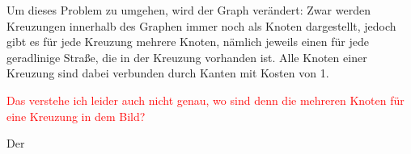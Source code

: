 \documentclass{article}
\theoremstyle{nonumberplain}
\begin{document}
Um dieses Problem zu umgehen, wird der Graph verändert: Zwar werden
Kreuzungen innerhalb des Graphen immer noch als Knoten dargestellt, jedoch gibt es für jede Kreuzung mehrere Knoten, nämlich jeweils einen für jede geradlinige Straße, die in der Kreuzung vorhanden ist.
Alle Knoten einer Kreuzung sind dabei verbunden durch Kanten mit Kosten von 1.

\textcolor{red}{Das verstehe ich leider auch nicht genau, wo sind denn die mehreren Knoten für eine Kreuzung in dem Bild?}

\begin {center}
\end{center}

Der 
\end{document}
